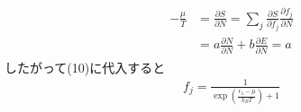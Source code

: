 \begin{align}
  \begin{split}
    -\frac{\mu}{T}&=\frac{\partial S}{\partial N}=\sum_j\frac{\partial S}{\partial f_j}\frac{\partial f_j}{\partial N}\\
    &=a\frac{\partial N}{\partial N}+b\frac{\partial E}{\partial N}=a
  \end{split}
\end{align}
したがって(10)に代入すると
\begin{align}
  f_j=\frac{1}{\exp\left(\frac{\epsilon_\lambda-\mu}{k_BT}\right)+1}
\end{align}